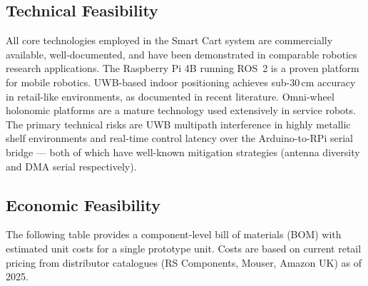 \subsection{Technical Feasibility}

All core technologies employed in the Smart Cart system are commercially
available, well-documented, and have been demonstrated in comparable
robotics research applications. The Raspberry Pi 4B running ROS~2 is a
proven platform for mobile robotics. UWB-based indoor positioning achieves
sub-30\,cm accuracy in retail-like environments, as documented in recent
literature. Omni-wheel holonomic platforms are a mature technology used
extensively in service robots. The primary technical risks are UWB
multipath interference in highly metallic shelf environments and real-time
control latency over the Arduino-to-RPi serial bridge --- both of which
have well-known mitigation strategies (antenna diversity and DMA serial
respectively).

\subsection{Economic Feasibility}

The following table provides a component-level bill of materials (BOM)
with estimated unit costs for a single prototype unit. Costs are based on
current retail pricing from distributor catalogues (RS Components, Mouser,
Amazon UK) as of 2025.

